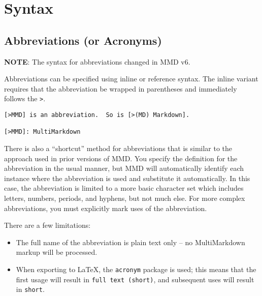 
\def\mytitle{MultiMarkdown Syntax}
\def\myauthor{Fletcher T. Penney}
\def\revised{2018-11-29}




\tableofcontents

\chapter{Syntax}
\label{syntax}

\section{Abbreviations (or Acronyms)}
\label{abbreviationsoracronyms}

\textbf{NOTE}: The syntax for abbreviations changed in \gls{MMD} v6.

Abbreviations can be specified using inline or reference syntax. The inline variant requires that the abbreviation be wrapped in parentheses and immediately follows the \texttt{>}.

\begin{verbatim}
[>MMD] is an abbreviation.  So is [>(MD) Markdown].

[>MMD]: MultiMarkdown
\end{verbatim}

There is also a ``shortcut'' method for abbreviations that is similar to the approach used in prior versions of \gls{MMD}. You specify the definition for the abbreviation in the usual manner, but \gls{MMD} will automatically identify each instance where the abbreviation is used and substitute it automatically. In this case, the abbreviation is limited to a more basic character set which includes letters, numbers, periods, and hyphens, but not much else. For more complex abbreviations, you must explicitly mark uses of the abbreviation.

There are a few limitations:

\begin{itemize}
\item The full name of the abbreviation is plain text only -- no MultiMarkdown markup will be processed.

\item When exporting to LaTeX, the \texttt{acronym} package is used; this means that the first usage will result in \texttt{full text (short)}, and subsequent uses will result in \texttt{short}.

\end{itemize}

